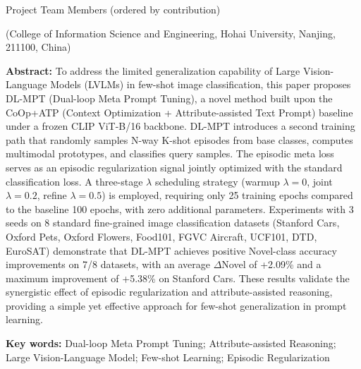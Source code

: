 \documentclass[10pt,a4paper]{ctexart}
\begin{document}
\vspace{0.2cm}

\begin{center}
{ Project Team Members (ordered by contribution)}
\end{center}

\begin{center}
{
(College of Information Science and Engineering, Hohai University, Nanjing, 211100, China)}
\end{center}

\vspace{0.3cm}

\noindent
{\bfseries Abstract: }
{
To address the limited generalization capability of Large Vision-Language Models (LVLMs) in few-shot image classification, this paper proposes DL-MPT (Dual-loop Meta Prompt Tuning), a novel method built upon the CoOp+ATP (Context Optimization + Attribute-assisted Text Prompt) baseline under a frozen CLIP ViT-B/16 backbone. DL-MPT introduces a second training path that randomly samples N-way K-shot episodes from base classes, computes multimodal prototypes, and classifies query samples. The episodic meta loss serves as an episodic regularization signal jointly optimized with the standard classification loss. A three-stage $\lambda$ scheduling strategy (warmup $\lambda{=}0$, joint $\lambda{=}0.2$, refine $\lambda{=}0.5$) is employed, requiring only 25 training epochs compared to the baseline 100 epochs, with zero additional parameters. Experiments with 3 seeds on 8 standard fine-grained image classification datasets (Stanford Cars, Oxford Pets, Oxford Flowers, Food101, FGVC Aircraft, UCF101, DTD, EuroSAT) demonstrate that DL-MPT achieves positive Novel-class accuracy improvements on 7/8 datasets, with an average $\Delta$Novel of +2.09\% and a maximum improvement of +5.38\% on Stanford Cars. These results validate the synergistic effect of episodic regularization and attribute-assisted reasoning, providing a simple yet effective approach for few-shot generalization in prompt learning.
}

\vspace{0.2cm}

\noindent
{\bfseries Key words: }
{
Dual-loop Meta Prompt Tuning; Attribute-assisted Reasoning; Large Vision-Language Model; Few-shot Learning; Episodic Regularization
}

\vspace{0.6cm}

\end{document}
